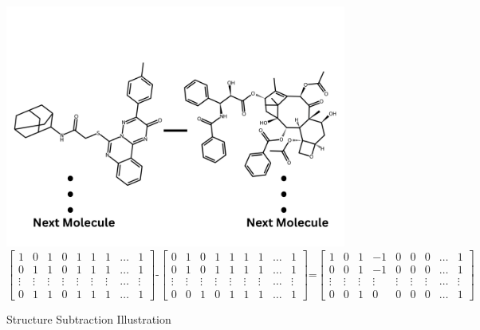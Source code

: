 \begin{figure}[h] %
	\centering
	\includegraphics[scale=0.18]{mol15_minus_mol135.png} %
	\vspace{-0.5cm}
	\begin{equation*}
		\begin{bmatrix}
			1 & 0 & 1 & 0 & 1 & 1 & 1 & \ldots & 1 \\ 
			0 & 1 & 1 & 0 & 1 & 1 & 1 & \ldots & 1 \\
			\vdots & \vdots & \vdots & \vdots & \vdots & \vdots & \vdots & \ldots & \vdots \\
			0 & 1 & 1 & 0 & 1 & 1 & 1 & \ldots & 1
		\end{bmatrix}
		\text{-}
		\begin{bmatrix}
			0 & 1 & 0 & 1 & 1 & 1 & 1 & \ldots & 1 \\ 
			0 & 1 & 0 & 1 & 1 & 1 & 1 & \ldots & 1 \\
			\vdots & \vdots & \vdots & \vdots & \vdots & \vdots & \vdots & \ldots & \vdots \\
			0 & 0 & 1 & 0 & 1 & 1 & 1 & \ldots & 1
		\end{bmatrix}
		\text{=}
		\begin{bmatrix}
			1 & 0 & 1 & -1 & 0 & 0 & 0 & \ldots & 1 \\ 
			0 & 0 & 1 & -1& 0 & 0 & 0 & \ldots & 1 \\
			\vdots & \vdots & \vdots & \vdots & \vdots & \vdots & \vdots & \ldots & \vdots \\
			0 & 0 & 1 & 0 & 0 & 0 & 0 & \ldots & 1
		\end{bmatrix}
	\end{equation*}
	\caption{Structure Subtraction Illustration}
	\vspace{-0.3cm}
	\label{fig:subtraction} %
\end{figure}
      
